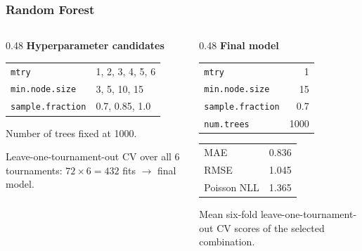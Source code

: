 \documentclass{beamer}
\begin{document}
\begin{frame}
  \frametitle{Random Forest}

  \begin{columns}[T]

    \begin{column}{0.48\textwidth}
      \textbf{Hyperparameter candidates}

      \vspace{0.4em}
      \footnotesize
      \begin{tabular}{ll}
        \toprule
        \texttt{mtry}              & 1, 2, 3, 4, 5, 6 \\
        \texttt{min.node.size}     & 3, 5, 10, 15 \\
        \texttt{sample.fraction}   & 0.7, 0.85, 1.0 \\
        \bottomrule
      \end{tabular}

      \vspace{0.8em}
      \scriptsize
      Number of trees fixed at 1000.

      \vspace{0.4em}
      Leave-one-tournament-out CV over all 6 tournaments:
      $72 \times 6 = 432$ fits $\rightarrow$ final model.

    \end{column}

    \begin{column}{0.48\textwidth}
      \textbf{Final model}

      \vspace{0.4em}
      \footnotesize
      \begin{tabular}{lr}
        \toprule
        \texttt{mtry}              & 1 \\
        \texttt{min.node.size}     & 15 \\
        \texttt{sample.fraction}   & 0.7 \\
        \texttt{num.trees}         & 1000 \\
        \bottomrule
      \end{tabular}

      \vspace{0.8em}
      \footnotesize
      \begin{tabular}{lr}
        \toprule
        MAE         & 0.836 \\
        RMSE        & 1.045 \\
        Poisson NLL & 1.365 \\
        \bottomrule
      \end{tabular}

      \vspace{0.4em}
      \scriptsize
      Mean six-fold leave-one-tournament-out CV scores
      of the selected combination.

    \end{column}

  \end{columns}

\end{frame}
\end{document}
